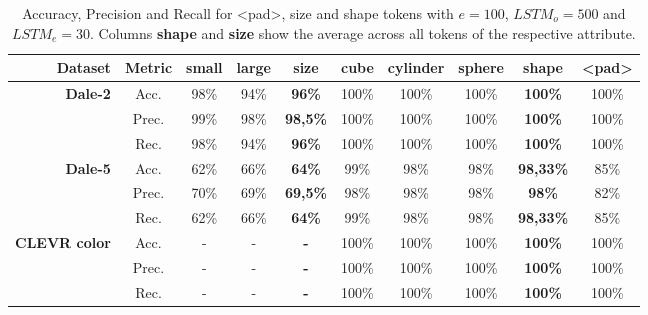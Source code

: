 \begin{table}[ht]
    \centering
    \begin{tabular}{r|c|cc|c|ccc|c|c}
        \toprule
        \textbf{Dataset}                      & {Metric} & {small} & {large} & \textbf{size}   & {cube}  & {cylinder} & {sphere} & \textbf{shape}   & {<pad>} \\\midrule
        \multirow{3}{*}{\textbf{Dale-2}}      & {Acc.}   & {98\%}  & {94\%}  & \textbf{96\%}   & {100\%} & {100\%}    & {100\%}  & \textbf{100\%}   & {100\%} \\
                                              & {Prec.}  & {99\%}  & {98\%}  & \textbf{98,5\%} & {100\%} & {100\%}    & {100\%}  & \textbf{100\%}   & {100\%} \\
                                              & {Rec.}   & {98\%}  & {94\%}  & \textbf{96\%}   & {100\%} & {100\%}    & {100\%}  & \textbf{100\%}   & {100\%} \\\midrule
        \multirow{3}{*}{\textbf{Dale-5}}      & {Acc.}   & {62\%}  & {66\%}  & \textbf{64\%}   & {99\%}  & {98\%}     & {98\%}   & \textbf{98,33\%} & {85\%}  \\
                                              & {Prec.}  & {70\%}  & {69\%}  & \textbf{69,5\%} & {98\%}  & {98\%}     & {98\%}   & \textbf{98\%}    & {82\%}  \\
                                              & {Rec.}   & {62\%}  & {66\%}  & \textbf{64\%}   & {99\%}  & {98\%}     & {98\%}   & \textbf{98,33\%} & {85\%}  \\\midrule
        \multirow{3}{*}{\textbf{CLEVR color}} & {Acc.}   & {-}     & {-}     & \textbf{-}      & {100\%} & {100\%}    & {100\%}  & \textbf{100\%}   & {100\%} \\
                                              & {Prec.}  & {-}     & {-}     & \textbf{-}      & {100\%} & {100\%}    & {100\%}  & \textbf{100\%}   & {100\%} \\
                                              & {Rec.}   & {-}     & {-}     & \textbf{-}      & {100\%} & {100\%}    & {100\%}  & \textbf{100\%}   & {100\%} \\
        \bottomrule
    \end{tabular}
    \caption{Accuracy, Precision and Recall for <pad>, size and shape tokens with $e=100$, $LSTM_o=500$ and $LSTM_e=30$. Columns \textbf{shape} and \textbf{size} show the average across all tokens of the respective attribute.}
    \label{tab:results:bb-re-generator_size-shape}
\end{table}

